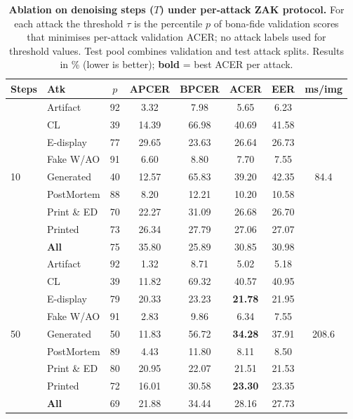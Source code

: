 \begin{table}[!htbp]
\centering
\scriptsize
\setlength{\tabcolsep}{3pt}
\caption{\textbf{Ablation on denoising steps ($T$) under per-attack ZAK protocol.}
For each attack the threshold $\tau$ is the percentile $p$ of bona-fide validation scores that minimises per-attack validation ACER; no attack labels used for threshold values. Test pool combines validation and test attack splits. Results in \% (lower is better); \textbf{bold} = best ACER per attack.}
\label{tab:ablation_study2}

\begin{tabular}{l l c c c c c c}
\toprule
\textbf{Steps} & \textbf{Atk} & $p$ & APCER & BPCER & ACER & EER & ms/img \\
\midrule

\multirow{9}{*}{10}
& Artifact       & 92 &   3.32 &   7.98 &                 5.65 &    6.23 & \multirow{9}{*}{84.4} \\
& CL             & 39 &  14.39 &  66.98 &                40.69 &   41.58 &  \\
& E-display      & 77 &  29.65 &  23.63 &                26.64 &   26.73 &  \\
& Fake W/AO      & 91 &   6.60 &   8.80 &                 7.70 &    7.55 &  \\
& Generated      & 40 &  12.57 &  65.83 &                39.20 &   42.35 &  \\
& PostMortem     & 88 &   8.20 &  12.21 &                10.20 &   10.58 &  \\
& Print \& ED    & 70 &  22.27 &  31.09 &                26.68 &   26.70 &  \\
& Printed        & 73 &  26.34 &  27.79 &                27.06 &   27.07 &  \\
& \textbf{All}  & 75 &  35.80 &  25.89 &                30.85 &   30.98 & \\
\midrule

\multirow{9}{*}{50}
& Artifact       & 92 &   1.32 &   8.71 &                 5.02 &    5.18 & \multirow{9}{*}{208.6} \\
& CL             & 39 &  11.82 &  69.32 &                40.57 &   40.95 &  \\
& E-display      & 79 &  20.33 &  23.23 &       \textbf{21.78} &   21.95 &  \\
& Fake W/AO      & 91 &   2.83 &   9.86 &                 6.34 &    7.55 &  \\
& Generated      & 50 &  11.83 &  56.72 &       \textbf{34.28} &   37.91 &  \\
& PostMortem     & 89 &   4.43 &  11.80 &                 8.11 &    8.50 &  \\
& Print \& ED    & 80 &  20.95 &  22.07 &                21.51 &   21.53 &  \\
& Printed        & 72 &  16.01 &  30.58 &       \textbf{23.30} &   23.35 &  \\
& \textbf{All}  & 69 &  21.88 &  34.44 &                28.16 &   27.73 & \\
\midrule


\end{tabular}
\end{table}

